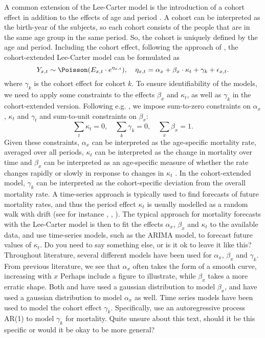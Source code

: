 \newpar A common extension of the Lee-Carter model is the introduction of a cohort effect in addition to the effects of age and period \parencite{Wisniowski2015}. A cohort can be interpreted as the birth-year of the subjects, so each cohort consists of the people that are in the same age group in the same period. So, the cohort is uniquely defined by the age and period. Including the cohort effect, following the approach of \textcite{Wisniowski2015}, the cohort-extended Lee-Carter model can be formulated as
\begin{equation}
    Y_{x,t} \sim \Poisson(E_{x,t}\cdot e^{\eta_{x,t}}), \quad \eta_{x,t} = \alpha_x + \beta_x \cdot \kappa_t + \gamma_k + \epsilon_{x,t}.
    \label{eq:LCC-model-orig}
\end{equation}
where $\gamma_k$ is the cohort effect for cohort $k$. 
To ensure identifiability of the models, we need to apply some constraints to the effects $\beta_x$ and $\kappa_t$, as well as $\gamma_k$ in the cohort-extended version. Following e.g. \textcite{LeeCarter1992}, we impose sum-to-zero constraints on $\alpha_x$, $\kappa_t$ and $\gamma_t$ and sum-to-unit constraints on $\beta_x$:
\begin{equation}
    \sum_t\kappa_t = 0,\quad \sum_k\gamma_k = 0, \quad \sum_x\beta_x = 1.
    \label{eq:LC-constraints}    
\end{equation}
Given these constraints, $\alpha_x$ can be interpreted as the age-specific mortality rate, averaged over all periods, $\kappa_t$ can be interpreted as the change in mortality over time and $\beta_x$ can be interpreted as an age-specific measure of whether the rate changes rapidly or slowly in response to changes in $\kappa_t$ \parencite{LeeCarter1992}. In the cohort-extended model, $\gamma_k$ can be interpreted as the cohort-specific deviation from the overall mortality rate.
\newpar
A time-series approach is typically used to find forecasts of future mortality rates, and thus the period effect $\kappa_t$ is usually modelled as a random walk with drift (see for instance \textcite{LeeCarter1992}, \textcite{Wisniowski2015}, \textcite{CZADO2005260}). The typical approach for mortality forecasts with the Lee-Carter model is then to fit the effects $\alpha_x$, $\beta_x$ and $\kappa_t$ to the available data, and use time-series models, such as the ARIMA model, to forecast future values of $\kappa_t$. \textcolor{myDarkGreen}{Do you need to say something else, or is it ok to leave it like this?} Throughout literature, several different models have been used for $\alpha_x$, $\beta_x$ and $\gamma_k$. From previous literature, we see that $\alpha_x$ often takes the form of a smooth curve, increasing with $x$ \textcolor{myDarkGreen}{Perhaps include a figure to illustrate}, while $\beta_x$ takes a more erratic shape. Both \textcite{CZADO2005260} and \textcite{Wisniowski2015} have used a gaussian distribution to model $\beta_x$, and \textcite{Wisniowski2015} have used a gaussian distribution to model $\alpha_x$ as well. Time series models have been used to model the cohort effect $\gamma_k$. Specifically, \textcite{Wisniowski2015} use an autoregressive process AR(1) to model $\gamma_k$ for mortality. \textcolor{myDarkGreen}{Quite unsure about this text, should it be this specific or would it be okay to be more general? }

